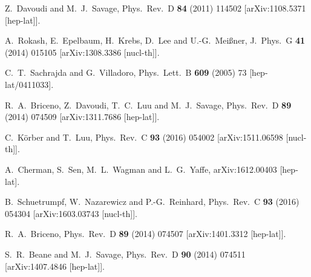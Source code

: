 \documentclass[aps,singlecolumn,superscriptaddress,nofootinbib,tightenlines,
preprintnumbers,showkeys]{revtex4-1}
\begin{document}
\begin{thebibliography}{99}
  Z.~Davoudi and M.~J.~Savage,
  Phys.\ Rev.\ D {\bf 84} (2011) 114502
  [arXiv:1108.5371 [hep-lat]].

  A.~Rokash, E.~Epelbaum, H.~Krebs, D.~Lee and U.-G.~Meißner,
  J.\ Phys.\ G {\bf 41} (2014) 015105
  [arXiv:1308.3386 [nucl-th]].

  C.~T.~Sachrajda and G.~Villadoro,
  Phys.\ Lett.\ B {\bf 609} (2005) 73
  [hep-lat/0411033].

  R.~A.~Briceno, Z.~Davoudi, T.~C.~Luu and M.~J.~Savage,
  Phys.\ Rev.\ D {\bf 89} (2014) 074509
  [arXiv:1311.7686 [hep-lat]].  

  C.~Körber and T.~Luu,
  Phys.\ Rev.\ C {\bf 93} (2016) 054002
  [arXiv:1511.06598 [nucl-th]].

  A.~Cherman, S.~Sen, M.~L.~Wagman and L.~G.~Yaffe,
  arXiv:1612.00403 [hep-lat].

  B.~Schuetrumpf, W.~Nazarewicz and P.-G.~Reinhard,
  Phys.\ Rev.\ C {\bf 93} (2016) 054304
  [arXiv:1603.03743 [nucl-th]].

  R.~A.~Briceno,
  Phys.\ Rev.\ D {\bf 89} (2014) 074507
  [arXiv:1401.3312 [hep-lat]].

  S.~R.~Beane and M.~J.~Savage,
  Phys.\ Rev.\ D {\bf 90} (2014) 074511
  [arXiv:1407.4846 [hep-lat]].


\end{thebibliography}
\end{document}

